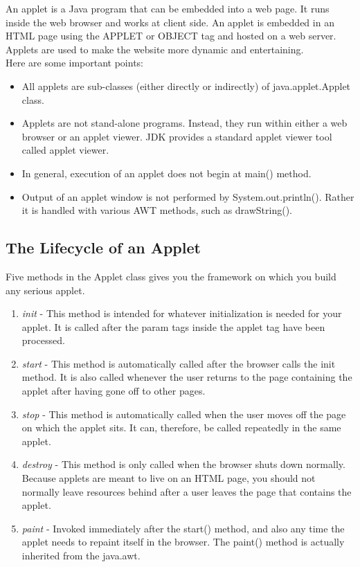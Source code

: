 \documentclass[11pt]{article}
\begin{document}
An applet is a Java program that can be embedded into a web page. It runs inside the web browser and works at client side. An applet is embedded in an HTML page using the APPLET or OBJECT tag and hosted on a web server.
Applets are used to make the website more dynamic and entertaining.\\

Here are some important points:
\begin{itemize}
	\item All applets are sub-classes (either directly or indirectly) of java.applet.Applet class.
	\item Applets are not stand-alone programs. Instead, they run within either a web browser or an applet viewer. JDK provides a standard applet viewer tool called applet viewer.
	\item In general, execution of an applet does not begin at main() method.
	\item Output of an applet window is not performed by System.out.println(). Rather it is handled with various AWT methods, such as drawString().
\end{itemize}
\subsection{The Lifecycle of an Applet}
Five methods in the Applet class gives you the framework on which you build any serious applet.
\begin{enumerate}
	\item \textit{init} - This method is intended for whatever initialization is needed for your applet. It is called after the param tags inside the applet tag have been processed.

	\item \textit{start} - This method is automatically called after the browser calls the init method. It is also called whenever the user returns to the page containing the applet after having gone off to other pages.

	\item \textit{stop} - This method is automatically called when the user moves off the page on which the applet sits. It can, therefore, be called repeatedly in the same applet.

	\item \textit{destroy} - This method is only called when the browser shuts down normally. Because applets are meant to live on an HTML page, you should not normally leave resources behind after a user leaves the page that contains the applet.

	\item \textit{paint} - Invoked immediately after the start() method, and also any time the applet needs to repaint itself in the browser. The paint() method is actually inherited from the java.awt.
\end{enumerate}
\end{document}
